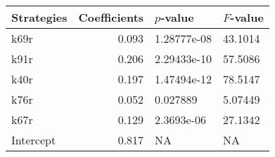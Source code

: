 \begin{tabular}{lrll}
\toprule
Strategies &  Coefficients &    $p$-value & $F$-value \\
\midrule
      k69r &         0.093 &  1.28777e-08 &   43.1014 \\
      k91r &         0.206 &  2.29433e-10 &   57.5086 \\
      k40r &         0.197 &  1.47494e-12 &   78.5147 \\
      k76r &         0.052 &     0.027889 &   5.07449 \\
      k67r &         0.129 &   2.3693e-06 &   27.1342 \\
 Intercept &         0.817 &           NA &        NA \\
\bottomrule
\end{tabular}
